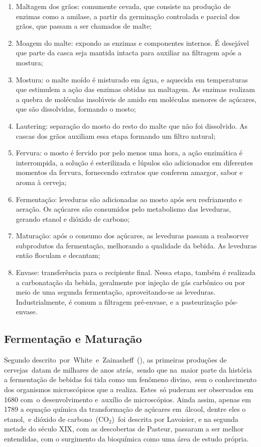 \begin{enumerate}
    \item Maltagem dos grãos: comumente cevada, que consiste na produção de
enzimas como a amilase, a partir da germinação controlada e parcial dos
grãos, que passam a ser chamados de malte;
    \item Moagem do malte: expondo as enzimas e componentes internos. É desejável
que parte da casca seja mantida intacta para auxiliar na filtragem após a
mostura;
    \item Mostura: o malte moído é misturado em água, e aquecida em temperaturas
que estimulem a ação das enzimas obtidas na maltagem. As enzimas
realizam a quebra de moléculas insolúveis de amido em moléculas menores
de açúcares, que são dissolvidas, formando o mosto;
    \item Lautering: separação do mosto do resto do malte que não foi dissolvido. As
cascas dos grãos auxiliam essa etapa formando um filtro natural;
    \item Fervura: o mosto é fervido por pelo menos uma hora, a ação enzimática é
interrompida, a solução é esterilizada e lúpulos são adicionados em diferentes
momentos da fervura, fornecendo extratos que conferem amargor, sabor e
aroma à cerveja;
    \item Fermentação: leveduras são adicionadas ao mosto após seu resfriamento e
aeração. Os açúcares são consumidos pelo metabolismo das leveduras,
gerando etanol e dióxido de carbono;
    \item Maturação: após o consumo dos açúcares, as leveduras passam a reabsorver
subprodutos da fermentação, melhorando a qualidade da bebida. As
leveduras então floculam e decantam;
    \item Envase: transferência para o recipiente final. Nessa etapa, também é
realizada a carbonatação da bebida, geralmente por injeção de gás carbônico
ou por meio de uma segunda fermentação, aproveitando-se as leveduras.
Industrialmente, é comum a filtragem pré-envase, e a pasteurização pós-
envase.
\end{enumerate}

\subsection{Fermentação e Maturação}


Segundo descrito por White e Zainasheff (), as primeiras produções de
cervejas datam de milhares de anos atrás, sendo que na maior parte da história a
fermentação de bebidas foi tida como um fenômeno divino, sem o conhecimento dos
organismos microscópicos que a realiza. Estes só puderam ser observados em 1680
com o desenvolvimento e auxílio de microscópios. Ainda assim, apenas em 1789 a
equação química da transformação de açúcares em álcool, dentre eles o etanol, e
dióxido de carbono ($\mathrm{CO_2}$) foi descrita por Lavoisier, e na segunda metade do século
XIX, com as descobertas de Pasteur, passaram a ser melhor entendidas, com o
surgimento da bioquímica como uma área de estudo própria. 



